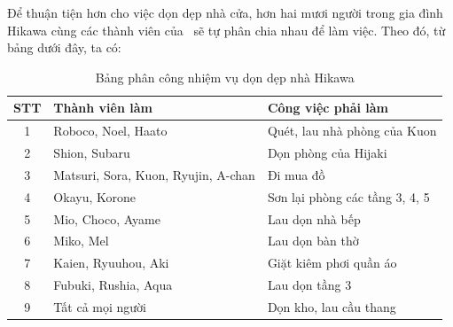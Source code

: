 \documentclass[../main.tex]{subfiles}
\begin{document}
Để thuận tiện hơn cho việc dọn dẹp nhà cửa, hơn hai mươi người trong gia đình Hikawa cùng các thành viên của \hll\ sẽ tự phân chia nhau để làm việc. Theo đó, từ bảng dưới đây, ta có:

\begin{table}[h!]
    \centering
    \begin{tabular}{|c|l|l|}
        \hline
        \textbf{STT} & \textbf{Thành viên làm}             & \textbf{Công việc phải làm}    \\ \hline
        1            & Roboco, Noel, Haato                 & Quét, lau nhà phòng của Kuon   \\ \hline
        2            & Shion, Subaru                       & Dọn phòng của Hijaki           \\ \hline
        3            & Matsuri, Sora, Kuon, Ryujin, A-chan & Đi mua đồ                      \\ \hline
        4            & Okayu, Korone                       & Sơn lại phòng các tầng 3, 4, 5 \\ \hline
        5            & Mio, Choco, Ayame                   & Lau dọn nhà bếp                \\ \hline
        6            & Miko, Mel                           & Lau dọn bàn thờ                \\ \hline
        7            & Kaien, Ryuuhou, Aki                 & Giặt kiêm phơi quần áo         \\ \hline
        8            & Fubuki, Rushia, Aqua                & Lau dọn tầng 3                 \\ \hline
        9            & Tất cả mọi người                    & Dọn kho, lau cầu thang         \\ \hline
    \end{tabular}
    \caption{Bảng phân công nhiệm vụ dọn dẹp nhà Hikawa}
\end{table}
\end{document}
